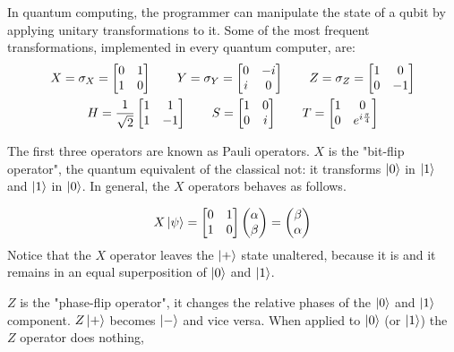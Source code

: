 In quantum computing, the programmer can manipulate the state of a qubit by applying unitary transformations to it. Some of the most frequent transformations, implemented in every quantum computer, are:
\begin{gather*}
	X = \sigma_X = \begin{bmatrix}
	0 & 1 \\
	1 & 0
	\end{bmatrix} \qquad
	Y = \sigma_Y = \begin{bmatrix}
	0 & -i \\
	i & 0
	\end{bmatrix} \qquad
	Z = \sigma_Z = \begin{bmatrix}
	1 & 0 \\
	0 & -1
	\end{bmatrix} \\ 
	H = \frac{1}{\sqrt{2}}\begin{bmatrix}
	1 & 1 \\
	1 & -1
	\end{bmatrix} \qquad
 	S = \begin{bmatrix}
	1 & 0 \\
	0 & i
	\end{bmatrix}\qquad
	T = \begin{bmatrix}
	1 & 0 \\
	0 & e^{i\frac{\pi}{4}}
	\end{bmatrix} 
\end{gather*}

The first three operators are known as Pauli operators. $X$ is the "bit-flip operator", the quantum equivalent of the classical not: it transforms $\ket{0}$ in $\ket{1}$ and $\ket{1}$ in $\ket{0}$. In general, the $X$ operators behaves as follows.

\[ X\ket{\psi} = \begin{bmatrix}
	0 & 1 \\
	1 & 0
	\end{bmatrix} 
	\begin{pmatrix}
	\alpha \\
	\beta	
	\end{pmatrix} = 
	\begin{pmatrix}
	\beta \\
	\alpha	
	\end{pmatrix}
\] 
Notice that the $X$ operator leaves the $\ket{+}$ state unaltered, because it is and it remains in an equal superposition of $\ket{0}$ and $\ket{1}$.


$Z$ is the "phase-flip operator", it changes the relative phases of the $\ket{0}$ and $\ket{1}$ component. $Z \ket{+}$ becomes $\ket{-}$ and vice versa. When applied to $\ket{0}$ (or $\ket{1}$) the $Z$ operator does nothing, 

